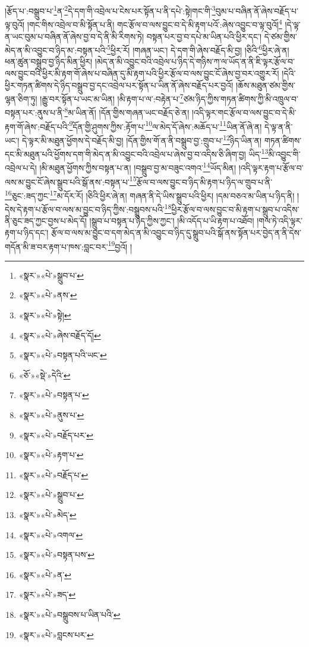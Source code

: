 །རྩོད་པ་:བསྒྲུབ་པ་\footnote{«སྣར་»«པེ་»སྒྲུབ་པ་}ན་\footnote{«སྣར་»«པེ་»ནས་}དེ་དག་གི་འབྲེལ་པ་ངེས་པར་སྟོན་པ་ནི་དཔེ་:སྟེ།གང་གི་\footnote{«སྣར་»«པེ་»སྟེ།}བུམ་པ་བཞིན་ནོ་ཞེས་བརྗོད་པ་ལྟ་བུའོ། །གང་གིས་འབྲེལ་བ་མི་སྟོན་པ་ནི། གང་རྩོལ་བ་ལས་བྱུང་བ་དེ་མི་རྟག་པའོ་:ཞེས་འབྱུང་བ་ལྟ་བུའོ།\footnote{«སྣར་»«པེ་»ཞེས་བརྗོད་དོ།} །དེ་ལྟ་ན་ཡང་བུམ་པ་བཞིན་ནོ་ཞེས་བྱ་བ་དེ་ནི་མི་རིགས་ཏེ། བསྟན་པར་བྱ་བ་དཔེ་མ་ཡིན་པའི་ཕྱིར་དང་། དེ་ཙམ་གྱིས་མེད་ན་མི་འབྱུང་བ་ཉིད་མ་:བསྟན་པའི་\footnote{«སྣར་»«པེ་»བསྟན་པའི་ཡང་}ཕྱིར་རོ། །གཞན་ཡང་། དེ་དག་གི་ཞེས་བརྗོད་མི་བྱ། །ཅིའི་\footnote{«ཅོ་»«སྡེ་»དེའི་}ཕྱིར་ཞེ་ན། ཕན་ཚུན་བསྒྲུབ་བྱ་ཉིད་མིན་ཕྱིར། །མེད་ན་མི་འབྱུང་བའི་འབྲེལ་པ་ཉིད་དེ་གཉིས་ཀ་ལ་ཡོད་ན་ནི་ཇི་ལྟར་རྩོལ་བ་ལས་བྱུང་བའི་ཕྱིར་མི་རྟག་གོ་ཞེས་པ་བཞིན་དུ་མི་རྟག་པའི་ཕྱིར་རྩོལ་བ་ལས་བྱུང་ངོ་ཞེས་བྱ་བར་འགྱུར་རོ། །དེའི་ཕྱིར་གཏན་ཚིགས་དེ་ཉིད་བསྒྲུབ་བྱ་དང་འབྲེལ་པར་སྟོན་པ་ཡིན་ནོ་ཞེས་བརྗོད་པར་བྱའོ། །ཆོས་མཐུན་ཙམ་གྱིས་ལྷན་ཅིག་ཏུ། །རྒྱུ་བར་སྟོན་པ་ཡང་མ་ཡིན། །མི་རྟག་པ་ལ་:བརྟེན་པ་\footnote{«སྣར་»«པེ་»བསྟན་པ་}ཙམ་ཉིད་ཀྱིས་གཏན་ཚིགས་ཀྱི་མི་འཁྲུལ་བ་བསྟན་པར་:ནུས་པ་ནི་\footnote{«སྣར་»«པེ་»ནུས་པ་}མ་ཡིན་ནོ། །དོན་གྱིས་གཞན་ཡང་བརྗོད་ཅེ་ན། །འདི་ལྟར་གང་རྩོལ་བ་ལས་བྱུང་བ་དེ་མི་རྟག་གོ་ཞེས་:བརྗོད་པའི་\footnote{«སྣར་»«པེ་»བརྗོད་པར་}དོན་གྱི་ཤུགས་ཀྱིས་:རྟོག་པ་\footnote{«སྣར་»«པེ་»རྟག་པ་}ལ་མེད་དོ་ཞེས་:མཆོད་པ་\footnote{«སྣར་»«པེ་»བརྗོད་པ་}ཡིན་ནོ་ཞེ་ན། དེ་ལྟ་ན་ནི་ཡང་། དེ་ལྟར་མི་མཐུན་ཕྱོགས་དེ་བརྗོད་མི་བྱ། །དོན་གྱིས་གོ་ན་ནི་བསྒྲུབ་བྱ་:གྲུབ་པ་\footnote{«སྣར་»«པེ་»སྒྲུབ་པ་}ཉིད་ཡིན་ན། གཏན་ཚིགས་དང་མི་མཐུན་པའི་ཕྱོགས་དག་གི་མེད་ན་མི་འབྱུང་བའི་འབྲེལ་པ་ཞེས་བྱ་བ་འདིས་ཅི་ཞིག་བྱ། ཡིད་\footnote{«སྣར་»«པེ་»མེད་}མི་འབྱུང་གི་འབྲེལ་པ་དེ། །མི་མཐུན་ཕྱོགས་ཀྱིས་བསྟན་པ་ན། །བསྒྲུབ་བྱ་མ་བཟུང་འགའ་\footnote{«སྣར་»«པེ་»འགལ་}ཡོད་མིན། །འདི་ལྟར་རྟག་པ་རྩོལ་བ་ལས་མ་བྱུང་ངོ་ཞེས་སྒྲུབ་པའི་སྒོ་ནས་:བསྟན་པ་\footnote{«སྣར་»«པེ་»བསྟན་པས་}རྩོལ་བ་ལས་བྱུང་བ་ཉིད་མི་རྟག་པ་ཉིད་ལ་གྲུབ་པ་ནི་\footnote{«སྣར་»«པེ་»ན་}ཅུང་:ཟད་ཀྱང་\footnote{«སྣར་»«པེ་»ཟད་}མ་དོར་རོ། །ཅིའི་ཕྱིར་ཞེ་ན། གཞན་ནི་དེ་ཡིས་སྒྲུབ་པའི་ཕྱིར། །དམ་བཅའ་མ་ཡིན་པ་ཉིད་ནི། །དེས་དེ་རྟག་པ་རྩོལ་བ་ལས་མ་བྱུང་བ་ཉིད་ཀྱིས་:བསྒྲུབས་པའི་\footnote{«སྣར་»«པེ་»བསྒྲུབས་པ་ཡིན་པའི་}ཕྱིར་རྩོལ་བ་ལས་བྱུང་བ་མི་རྟག་པ་སྒྲུབ་པ་འདིས་ནི་ཅུང་ཟད་ཀྱང་བྱས་པ་མེད་དོ། །སྒྲུབ་པ་བསྟན་པ་ཉིད་ཀྱིས་ཀྱང་། །མི་འདོད་པ་ཡི་རྟག་པ་འཐོབ། །གལ་ཏེ་འདི་ལྟར་རྟག་པ་ཉིད་དང་། རྩོལ་བ་ལས་མ་བྱུང་བ་དག་མེད་ན་མི་འབྱུང་བ་ཉིད་དུ་སྒྲུབ་པའི་སྒོ་ནས་སྟོན་པར་བྱེད་ན་ནི་དེས་གདོན་མི་ཟ་བར་རྟག་པ་ཁས་:བླང་བར་\footnote{«སྣར་»«པེ་»བླངས་པར་}བྱའོ། །
